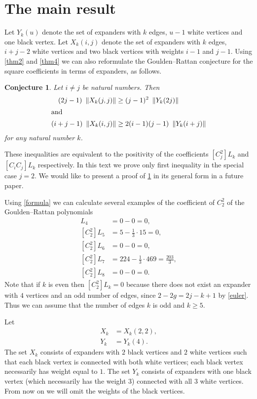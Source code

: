 \documentclass[submission]{FPSAC2021}
\newtheorem{con}{Conjecture}
\begin{document}
\section{The main result} 

Let $Y_k(u)$ denote the set of expanders 
with $k$ edges, $u-1$ white vertices and 
one black vertex. Let $X_k(i, j)$ denote 
the set of expanders with $k$ edges, 
$i+j-2$ white vertices and two black 
vertices with weights $i-1$ and $j-1$. 
Using  \cref{thm2} and \cref{thm4} we can 
also reformulate the Goulden--Rattan 
conjecture for the square coefficients 
in terms of expanders, as follows.
\begin{con} 
    \label{con:GJ2}
Let $i \neq j$ be natural numbers. Then 
\begin{align*}
(2j-1)\ \left\| X_k(j, j) \right\|    &   \geq (j-1)^2\ \left\| Y_k(2j) \right\| \\
\intertext{and}
(i+j-1)\ \left\| X_k(i, j) \right\|  & \geq 2(i-1)(j-1)\ \left\| Y_k(i+j) \right\|
\end{align*}
for any natural number $k$. 
\end{con}
These inequalities are equivalent to the 
positivity of the coefficients $[C_j^2] L_k$ 
and $[C_i C_j] L_k$ respectively. 
In this text we prove only first inequality  
in the special case 
$j=2$. We would like to present
a proof of \cref{con:GJ2} in its general 
form in a future paper.

Using \cref{formula} 
we can calculate several examples of 
the coefficient of $C_2^2$ of 
the Goulden--Rattan polynomials
\begin{align*}
[C_2^2] L_4 &=0-0=0,\\
[C_2^2] L_5 &=5-\frac{1}{3} \cdot 15=0,\\
[C_2^2] L_6 &=0-0=0, \\
[C_2^2] L_7 &=224-\frac{1}{3} \cdot 469=\frac{203}{3}, \\
[C_2^2] L_8 &=0-0=0. 
\end{align*}
Note that if $k$ is even then $[C_2^2] L_k=0$ because there does not exist an expander with $4$ vertices and an odd number of edges, since
$2-2g=2j-k+1$ by \cref{euler}. Thus we can assume that the number of edges $k$ is odd and $k \geq 5$. 

Let 
\begin{align}
\label{xdef}
X_k &= X_k(2, 2), \\
\label{ydef}
Y_k &= Y_k(4).
\end{align}
The set $X_k$ consists of expanders with 
$2$ black vertices and $2$ white vertices
such that each black vertex is connected 
with both white vertices;
each black vertex necessarily has weight 
equal to $1$. The set $Y_k$ consists of 
expanders with one black vertex 
(which necessarily has the weight $3$) 
connected with all $3$ white vertices. 
From now on we will omit the weights 
of the black vertices.
\end{document}

